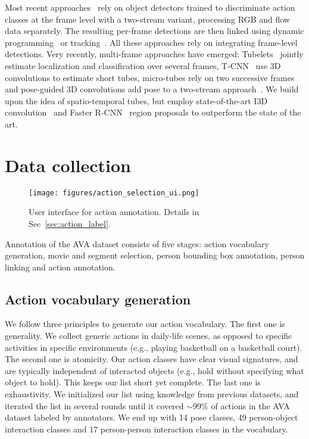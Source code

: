 \documentclass[10pt,twocolumn,letterpaper]{article}
\begin{document}
Most recent approaches~\cite{gkioxari2015,peng2016multi,saha2016,weinzaepfel2015} rely on object detectors trained to discriminate action classes at the frame level with a two-stream variant, processing RGB and flow data separately. The resulting per-frame detections are then linked using dynamic programming~\cite{gkioxari2015,Singh_ICCV2017} or tracking~\cite{weinzaepfel2015}. All these approaches rely on integrating frame-level detections. Very recently, multi-frame approaches have emerged: Tubelets~\cite{tubelets_iccv17} jointly estimate localization and classification over several frames, T-CNN~\cite{T_CNN_iccv17} use 3D convolutions to estimate short tubes, micro-tubes rely on two successive frames~\cite{micro_tube2017} and pose-guided 3D convolutions add pose to a two-stream approach~\cite{pose_brox2017}. We build upon the idea of spatio-temporal tubes, but employ state-of-the-art I3D convolution~\cite{i3d_cvpr17} and Faster R-CNN~\cite{ren2015faster} region proposals to outperform the state of the art.
\vspace{-0.8em} 
\section{Data collection}
\label{sec:collection}

\begin{figure}[t]
\centerline{\texttt{[image: figures/action\_selection\_ui.png]}}
\caption{User interface for action annotation. Details in Sec~\ref{sec:action_label}.}
\label{fig:annotation}
\vspace{-1em}
\end{figure}

Annotation of the AVA dataset consists of five stages: action vocabulary generation, movie and segment selection, person bounding box annotation, person linking and action annotation.

\subsection{Action vocabulary generation}

We follow three principles to generate our action vocabulary. The first one is generality. We collect generic actions in daily-life scenes, as opposed to specific activities in specific environments (e.g., playing basketball on a basketball court). The second one is atomicity. Our action classes have clear visual signatures, and are typically independent of interacted objects (e.g., hold without specifying what object to hold). This keeps our list short yet complete. The last one is exhaustivity. We initialized our list using knowledge from previous datasets, and iterated the list in several rounds until it covered $\sim$99\% of actions in the AVA dataset labeled by annotators. We end up with 14 pose classes, 49 person-object interaction classes and 17 person-person interaction classes in the vocabulary.
\end{document}
